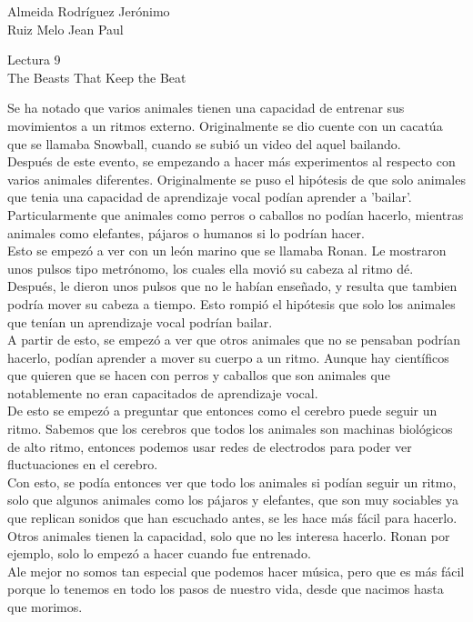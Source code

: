 \documentclass[a4paper, 12pt]{report}
\begin{document}
\begin{flushright}
    Almeida Rodríguez Jerónimo\\
    Ruiz Melo Jean Paul
\end{flushright}

\begin{center}
    {\LARGE Lectura 9}\\
    {\LARGE The Beasts That Keep the Beat}
\end{center}

Se ha notado que varios animales tienen una capacidad de entrenar
sus movimientos a un ritmos externo. Originalmente se dio cuente con
un cacatúa que se llamaba Snowball, cuando se subió un video del aquel
bailando. \\

Después de este evento, se empezando a hacer más experimentos al respecto
con varios animales diferentes. Originalmente se puso el hipótesis de que
solo animales que tenia una capacidad de aprendizaje vocal podían aprender a
'bailar'. Particularmente que animales como perros o caballos no podían hacerlo,
mientras animales como elefantes, pájaros o humanos si lo podrían hacer.\\

Esto se empezó a ver con un león marino que se llamaba Ronan. Le mostraron
unos pulsos tipo metrónomo, los cuales ella movió su cabeza al ritmo dé.
Después, le dieron unos pulsos que no le habían enseñado, y resulta que 
tambien podría mover su cabeza a tiempo. Esto rompió el hipótesis que solo los
animales que tenían un aprendizaje vocal podrían bailar.\\

A partir de esto, se empezó a ver que otros animales que no se pensaban podrían
hacerlo, podían aprender a mover su cuerpo a un ritmo. Aunque hay científicos que
quieren que se hacen con perros y caballos que son animales que notablemente no eran
capacitados de aprendizaje vocal.\\

De esto se empezó a preguntar que entonces como el cerebro puede seguir un ritmo.
Sabemos que los cerebros que todos los animales son machinas biológicos de alto
ritmo, entonces podemos usar redes de electrodos para poder ver fluctuaciones
en el cerebro.\\

Con esto, se podía entonces ver que todo los animales si podían seguir un ritmo,
solo que algunos animales como los pájaros y elefantes, que son muy sociables
ya que replican sonidos que han escuchado antes, se les hace más fácil para hacerlo.
Otros animales tienen la capacidad, solo que no les interesa hacerlo. Ronan por ejemplo,
solo lo empezó a hacer cuando fue entrenado. \\

Ale mejor no somos tan especial que podemos hacer música, pero que es más fácil
porque lo tenemos en todo los pasos de nuestro vida, desde que nacimos hasta
que morimos.
\end{document}
